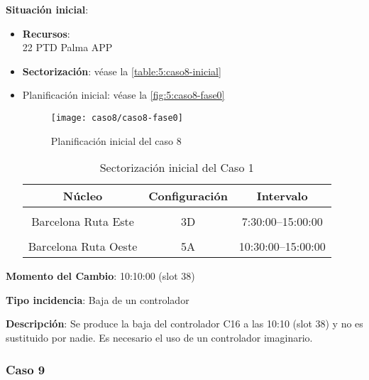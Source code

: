 \textbf{Situación inicial}:
\begin{itemize}[label={}]
	
	\item \textbf{Recursos}: \\
	22 PTD Palma APP \\
	
	
	\item \textbf{Sectorización}: véase la \autoref{table:5:caso8-inicial}
	
	\item Planificación inicial: véase la \autoref{fig:5:caso8-fase0}
	
	\begin{figure}[!h]
		\centering
		\texttt{[image: caso8/caso8-fase0]}
		\caption{Planificación inicial del caso 8}
		\label{fig:5:caso8-fase0}
	\end{figure}

	\begin{table}[h]
		\centering
		\caption{Sectorización inicial del Caso 1}
		\begin{tabular}{ccc}
			\hline
			\textbf{Núcleo}      & \textbf{Configuración} & \textbf{Intervalo}   \\ \hline
			\multicolumn{1}{l}{} & \multicolumn{1}{l}{}   & \multicolumn{1}{l}{} \\
			Barcelona Ruta Este  & 3D                     & 7:30:00--15:00:00    \\
			\multicolumn{1}{l}{} & \multicolumn{1}{l}{}   & \multicolumn{1}{l}{} \\
			Barcelona Ruta Oeste & 5A                     & 10:30:00--15:00:00   \\ \hline
		\end{tabular}
		\label{table:5:caso8-inicial}
	\end{table}
	
\end{itemize}

\textbf{Momento del Cambio}: 10:10:00 (slot 38)

\textbf{Tipo incidencia}: Baja de un controlador

\textbf{Descripción}: Se produce la baja del controlador C16 a las 10:10 (slot 38) y no es sustituido por nadie. Es necesario el uso de un controlador imaginario.


\subsubsection{Caso 9}

